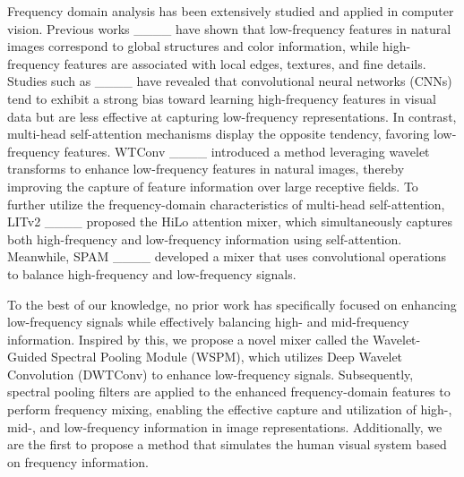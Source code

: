 Frequency domain analysis has been extensively studied and applied in computer vision. Previous works ____ have shown that low-frequency features in natural images correspond to global structures and color information, while high-frequency features are associated with local edges, textures, and fine details. Studies such as ____ have revealed that convolutional neural networks (CNNs) tend to exhibit a strong bias toward learning high-frequency features in visual data but are less effective at capturing low-frequency representations. In contrast, multi-head self-attention mechanisms display the opposite tendency, favoring low-frequency features.
WTConv ____ introduced a method leveraging wavelet transforms to enhance low-frequency features in natural images, thereby improving the capture of feature information over large receptive fields. To further utilize the frequency-domain characteristics of multi-head self-attention, LITv2 ____ proposed the HiLo attention mixer, which simultaneously captures both high-frequency and low-frequency information using self-attention. Meanwhile, SPAM ____ developed a mixer that uses convolutional operations to balance high-frequency and low-frequency signals.



To the best of our knowledge, no prior work has specifically focused on enhancing low-frequency signals while effectively balancing high- and mid-frequency information. Inspired by this, we propose a novel mixer called the Wavelet-Guided Spectral Pooling Module (WSPM), which utilizes Deep Wavelet Convolution (DWTConv) to enhance low-frequency signals. Subsequently, spectral pooling filters are applied to the enhanced frequency-domain features to perform frequency mixing, enabling the effective capture and utilization of high-, mid-, and low-frequency information in image representations. Additionally, we are the first to propose a method that simulates the human visual system based on frequency information.